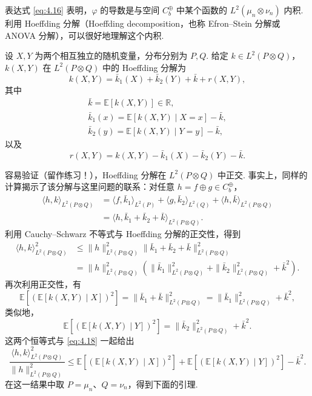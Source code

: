 表达式 \eqref{eq:4.16} 表明，$\varphi$ 的导数是与空间 $C_b^\oplus$ 中某个函数的 $L^2(\mu_n\otimes\nu_n)$ 内积. 利用 Hoeffding 分解（Hoeffding decomposition，也称 Efron--Stein 分解或 ANOVA 分解）\cite{ref164}，可以很好地理解这个内积.
\begin{definition}\label{def:4.6}
设 $X,Y$ 为两个相互独立的随机变量，分布分别为 $P,Q$. 给定 $k\in L^2(P\otimes Q)$，$k(X,Y)$ 在 $L^2(P\otimes Q)$ 中的 Hoeffding 分解为
$$k(X,Y)=\bar k_1(X)+\bar k_2(Y)+\bar k+r(X,Y),$$
其中
$$\begin{gathered}
\bar k=\mathbb E[k(X,Y)]\in\mathbb R,\\
\bar k_1(x)=\mathbb E[k(X,Y)\mid X=x]-\bar k,\\
\bar k_2(y)=\mathbb E[k(X,Y)\mid Y=y]-\bar k,
\end{gathered}$$
以及
$$r(X,Y)=k(X,Y)-\bar k_1(X)-\bar k_2(Y)-\bar k.$$
\end{definition}
容易验证（留作练习！），Hoeffding 分解在 $L^2(P\otimes Q)$ 中正交. 事实上，同样的计算揭示了该分解与这里问题的联系：对任意 $h=f\oplus g\in C_b^\oplus$，
$$\begin{aligned}
\langle h,k\rangle_{L^2(P\otimes Q)}
&=\langle f,\bar k_1\rangle_{L^2(P)}+\langle g,\bar k_2\rangle_{L^2(Q)}
+\langle h,\bar k\rangle_{L^2(P\otimes Q)}\\
&=\langle h,\bar k_1+\bar k_2+\bar k\rangle_{L^2(P\otimes Q)}.
\end{aligned}$$
利用 Cauchy--Schwarz 不等式与 Hoeffding 分解的正交性，得到
\begin{equation}\label{eq:4.18}
\begin{aligned}
\langle h,k\rangle_{L^2(P\otimes Q)}^2
&\le\|h\|_{L^2(P\otimes Q)}^2\|\bar k_1+\bar k_2+\bar k\|_{L^2(P\otimes Q)}^2\\
&=\|h\|_{L^2(P\otimes Q)}^2
\left(\|\bar k_1\|_{L^2(P\otimes Q)}^2+\|\bar k_2\|_{L^2(P\otimes Q)}^2+\bar k^2\right).
\end{aligned}
\end{equation}
再次利用正交性，有
$$\mathbb E[(\mathbb E[k(X,Y)\mid X])^2]
=\|\bar k_1+\bar k\|_{L^2(P\otimes Q)}^2
=\|\bar k_1\|_{L^2(P\otimes Q)}^2+\bar k^2,$$
类似地，
$$\mathbb E[(\mathbb E[k(X,Y)\mid Y])^2]
=\|\bar k_2\|_{L^2(P\otimes Q)}^2+\bar k^2.$$
这两个恒等式与 \eqref{eq:4.18} 一起给出
$$\frac{\langle h,k\rangle_{L^2(P\otimes Q)}^2}{\|h\|_{L^2(P\otimes Q)}^2}
\le\mathbb E[(\mathbb E[k(X,Y)\mid X])^2]
+\mathbb E[(\mathbb E[k(X,Y)\mid Y])^2]-\bar k^2.$$
在这一结果中取 $P=\mu_n$、$Q=\nu_n$，得到下面的引理.
